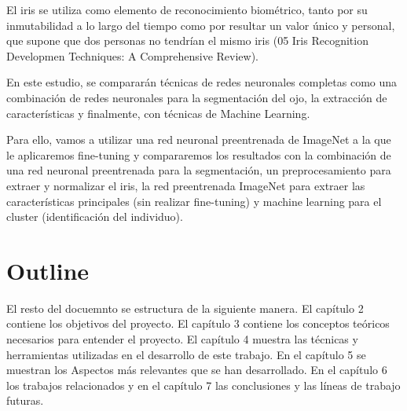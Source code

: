 
El iris se utiliza como elemento de reconocimiento biométrico, tanto por su inmutabilidad a lo largo del tiempo como por resultar un valor único y 
personal, que supone que dos personas no tendrían el mismo iris (05 Iris Recognition Developmen Techniques: A Comprehensive Review).

En este estudio, se compararán técnicas de redes neuronales completas como una combinación de redes neuronales para la segmentación del ojo, la extracción
de características y finalmente, con técnicas de Machine Learning.

Para ello, vamos a utilizar una red neuronal preentrenada de ImageNet a la que le aplicaremos fine-tuning y compararemos los resultados con la combinación de
una red neuronal preentrenada para la segmentación, un preprocesamiento para extraer y normalizar el iris, la red preentrenada ImageNet para extraer las características principales
(sin realizar fine-tuning) y machine learning para el cluster (identificación del individuo).

\section{Outline}

El resto del docuemnto se estructura de la siguiente manera. El capítulo 2 contiene los objetivos del proyecto. El capítulo 3 contiene los conceptos teóricos necesarios
para entender el proyecto. El capítulo 4 muestra las técnicas y herramientas utilizadas en el desarrollo de este trabajo. En el capítulo 5 se muestran los Aspectos
más relevantes que se han desarrollado. En el capítulo 6 los trabajos relacionados y en el capítulo 7 las conclusiones y las líneas de trabajo futuras.
